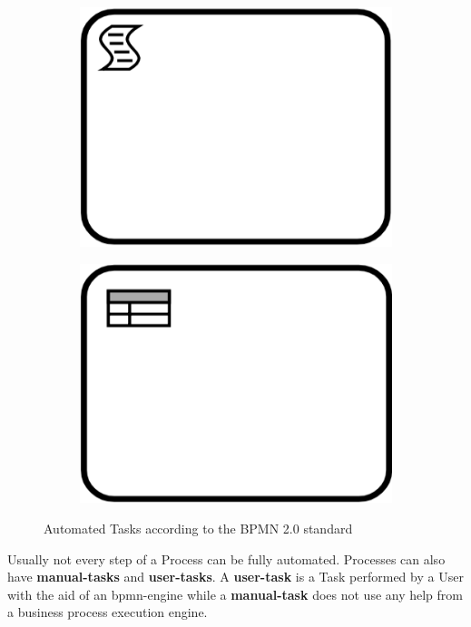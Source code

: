 \begin{figure}[h]
\begin{subfigure}[b]{0.18\columnwidth}
		\label{fig:receivetask}
	\end{subfigure}
	\begin{subfigure}[b]{0.18\columnwidth}
		\centering
		\includegraphics[width=0.9\columnwidth]{graphics/script-task}
		\label{fig:scripttask}
	\end{subfigure}
	\begin{subfigure}[b]{0.24\columnwidth}
		\includegraphics[width=0.675\columnwidth]{graphics/businessrule-task}
		\label{fig:businessruletask}
	\end{subfigure}
	\caption{Automated Tasks according to the BPMN 2.0 standard \cite{bpmnstandard}} %
	\label{fig:automatedtasks} %
\end{figure}

Usually not every step of a Process can be fully automated. Processes can also have \textbf{\gls{manual-task}s} and \textbf{\gls{user-task}s}. A \textbf{\gls{user-task}} is a Task performed by a User with the aid of an \gls{bpmn-engine} while a \textbf{\gls{manual-task}} does not use any help from a business process execution engine. 

